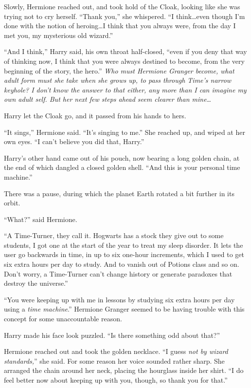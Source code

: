 Slowly, Hermione reached out, and took hold of the Cloak, looking like she was trying not to cry herself. “Thank you,” she whispered. “I think…even though I’m done with the notion of heroing…I think that you always were, from the day I met you, my mysterious old wizard.”

“And I think,” Harry said, his own throat half-closed, “even if you deny that way of thinking now, I think that you were always destined to become, from the very beginning of the story, the hero.” \emph{Who must Hermione Granger become, what adult form must she take when she grows up, to pass through Time’s narrow keyhole? I don’t know the answer to that either, any more than I can imagine my own adult self. But her next few steps ahead seem clearer than mine…}

Harry let the Cloak go, and it passed from his hands to hers.

“It sings,” Hermione said. “It’s singing to me.” She reached up, and wiped at her own eyes. “I can’t believe you did that, Harry.”

Harry’s other hand came out of his pouch, now bearing a long golden chain, at the end of which dangled a closed golden shell. “And this is your personal time machine.”

There was a pause, during which the planet Earth rotated a bit further in its orbit.

“What?” said Hermione.

“A Time-Turner, they call it. Hogwarts has a stock they give out to some students, I got one at the start of the year to treat my sleep disorder. It lets the user go backwards in time, in up to six one-hour increments, which I used to get six extra hours per day to study. And to vanish out of Potions class and so on. Don’t worry, a Time-Turner can’t change history or generate paradoxes that destroy the universe.”

“You were keeping up with me in lessons by studying six extra hours per day using a \emph{time machine}.” Hermione Granger seemed to be having trouble with this concept for some unaccountable reason.

Harry made his face look puzzled. “Is there something odd about that?”

Hermione reached out and took the golden necklace. “I guess \emph{not by wizard standards,}” she said. For some reason her voice sounded rather sharp. She arranged the chain around her neck, placing the hourglass inside her shirt. “I do feel better now about keeping up with you, though, so thank you for that.”

